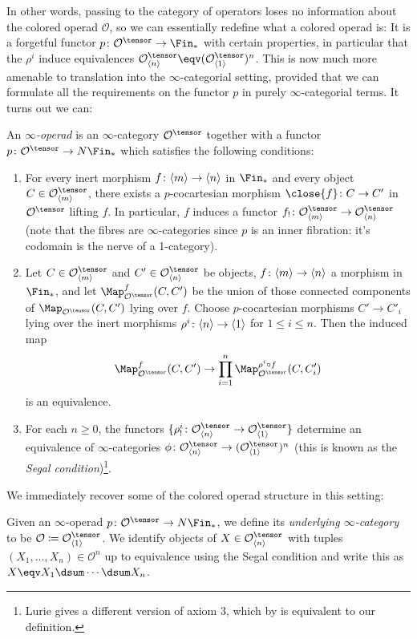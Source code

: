 \documentclass[topology]{bsteffan-notes}
\newcommand{\cO}{{\mathcal{O}}}
\DeclarePairedDelimiter{\FSn}{\langle}{\rangle}
\begin{document}
In other words, passing to the category of operators loses no information about the colored operad $\cO$, so we can essentially redefine what a colored operad is:
It is a forgetful functor $p\colon \cO^\tensor \to \Fin_*$ with certain properties, in particular that the $\rho^i$ induce equivalences $\cO^\tensor_{\langle n\rangle} \eqv (\cO^{\tensor}_{\langle 1 \rangle})^n$.
This is now much more amenable to translation into the $\infty$-categorial setting, provided that we can formulate all the requirements on the functor $p$ in purely $\infty$-categorial terms.
It turns out we can:
\begin{definition}
	An \emph{$\infty$-operad} is an $\infty$-category $\cO^\tensor$ together with a functor $p\colon \cO^\tensor \to N\Fin_*$ which satisfies the following conditions:
	\begin{enumerate}
		\item For every inert morphism $f\colon \FSn{m} \to \FSn{n}$ in $\Fin_*$ and every object $C \in \cO^\tensor_{\FSn{m}}$, there exists a $p$-cocartesian morphism $\close{f}\colon C \to C'$ in $\cO^\tensor$ lifting $f$.
			In particular, $f$ induces a functor $f_!\colon \cO^\tensor_{\FSn{m}} \to \cO^\tensor_{\FSn{n}}$ (note that the fibres are $\infty$-categories since $p$ is an inner fibration: it's codomain is the nerve of a 1-category).
		\item Let $C \in \cO^\tensor_{\FSn{m}}$ and $C' \in \cO^\tensor_{\FSn{n}}$ be objects, $f\colon \FSn{m} \to \FSn{n}$ a morphism in $\Fin_*$, and let $\Map^f_{\cO^\tensor}(C, C')$ be the union of those connected components of $\Map_{\cO^\tensor}(C, C')$ lying over $f$.
			Choose $p$-cocartesian morphisms $C' \to C'_i$ lying over the inert morphisms $\rho^i\colon \FSn{n} \to \FSn{1}$ for $1 \leq i \leq n$.
			Then the induced map
			\begin{equation*}
				\Map^f_{\cO^\tensor}(C, C') \to \prod_{i = 1}^n \Map^{\rho^i \circ f}_{\cO^\tensor}(C, C'_i)
			\end{equation*}
			is an equivalence.
		\item For each $n \geq 0$, the functors $\{\rho^i_!\colon \cO^\tensor_{\FSn{n}} \to \cO^\tensor_{\FSn{1}}\}$ determine an equivalence of $\infty$-categories $\phi\colon \cO^\tensor_{\FSn{n}} \to (\cO^\tensor_{\FSn{1}})^n$ (this is known as the \emph{Segal condition})\footnote{Lurie gives a different version of axiom 3, which by \cite[Remark 2.1.1.14]{lurie_higher_2017} is equivalent to our definition.}.
	\end{enumerate}
\end{definition}
We immediately recover some of the colored operad structure in this setting:
\begin{definition}
	Given an $\infty$-operad $p\colon \cO^\tensor \to N\Fin_*$, we define its \emph{underlying $\infty$-category} to be $\cO \coloneq \cO^\tensor_{\FSn{1}}$.
	We identify objects of $X \in \cO^\tensor_{\FSn{n}}$ with tuples $(X_1, \ldots, X_n) \in \cO^n$ up to equivalence using the Segal condition and write this as $X \eqv X_1 \dsum \cdots \dsum X_n$.
\end{definition}
\end{document}
